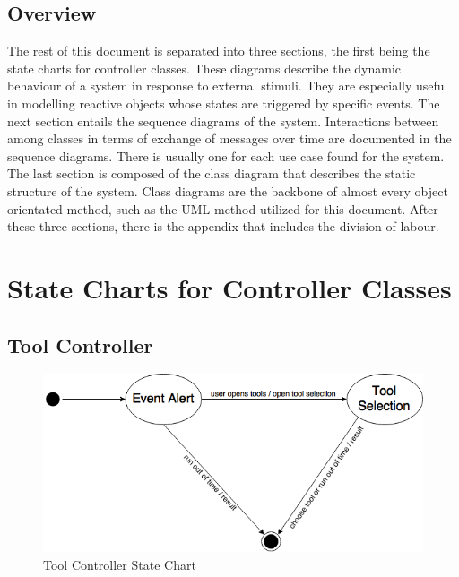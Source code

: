 \documentclass[12pt, titlepage]{article}
\newcommand\tab[1][1cm]{\hspace*{#1}}
\begin{document}
\subsection{Overview}
\label{sub:overview}
\tab The rest of this document is separated into three sections, the first being the state charts for controller classes. These diagrams describe the dynamic behaviour of a system in response to external stimuli. They are especially useful in modelling reactive objects whose states are triggered by specific events. The next section entails the sequence diagrams of the system. Interactions between among classes in terms of exchange of messages over time are documented in the sequence diagrams. There is usually one for each use case found for the system. The last section is composed of the class diagram that describes the static structure of the system. Class diagrams are the backbone of almost every object orientated method, such as the UML method utilized for this document. After these three sections, there is the appendix that includes the division of labour. 



\section{State Charts for Controller Classes}
\label{sec:state_charts_for_controller_classes}

\subsection*{Tool Controller}
\begin{figure}[H]
\centering
\includegraphics[width=120mm]{ToolController.png}
\caption{Tool Controller State Chart}
\end{figure}
\end{document}
